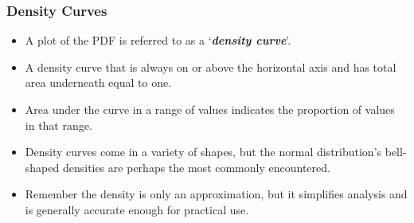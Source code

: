 \documentclass[IntroMain.tex]{subfiles}
\begin{document}
\begin{frame}
	
	\frametitle{Density Curves}
	
	
	\begin{itemize}
		\item A plot of the PDF is referred to as a `\textbf{\emph{density curve}}'.
		\item A density curve that is always on or above the horizontal axis and has total area underneath equal to one.
		\item Area under the curve in a range of values indicates the proportion of values in that range.
		\item Density curves come in a variety of shapes, but the normal distribution's bell-shaped densities are perhaps the most commonly encountered.
		\item Remember the density is only an approximation, but it simplifies analysis and is generally accurate enough for practical use.
	\end{itemize}
\end{frame}
\end{document}
